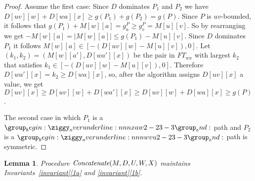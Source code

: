 \documentclass[11pt]{article}
\newtheorem{lemma}[theorem]{Lemma}
\newcommand{\Concat}{\mbox{{\it Concatenate}}}
\begin{document}
\begin{proof}
    Assume the first case: Since $D$ dominates $P_1$ and $P_2$ we have $D[u v][w] + D[w a][x] \ge g(P_1) + g(P_2) = g(P)$. Since $P$ is $uv$-bounded, it follows that $g(P_1) + M[w][a] = g_a^P \ge g_{v}^P = M[u][v]$. So by rearranging we get 
    $-M[w][a]=|M[w][a]| \le g(P_1) - M[u][v]$.
    Since $D$ dominates $P_1$ it follows $
    M[w][a]\in [-(D[u v][w] - M[u][v]),0]$.
    Let $(k_1,k_2)=(M[w][a'], D[wa'][x])$ be the pair in $FT_{wx}$ with largest $k_2$ that satisfies $k_1 \in [-(D[u v][w] - M[u][v]),0]$.  Therefore $D[wa'][x] = k_2 \ge D[wa][x]$, so, after the algorithm assigns $D[uv][x]$ a value, we get $D[uv][x] \ge D[uv][w]+D[wa'][x] \ge D[uv][w]+D[wa][x] \ge g(P)$.
    
    The second case in which $P_1$ is a $\overunderline{xaw}{2-2}{3-3}$ path and $P_2$ is a $\overunderline{wvu}{2-2}{3-3}$ path is symmetric.
\end{proof}


\begin{lemma}\label{lemma:concat-maintains-invariant}
    Procedure $\Concat(M,D,U,W,X)$ maintains Invariants~\ref{invariant}\ref{1a} and \ref{invariant}\ref{1b}.
\end{lemma}
\end{document}
